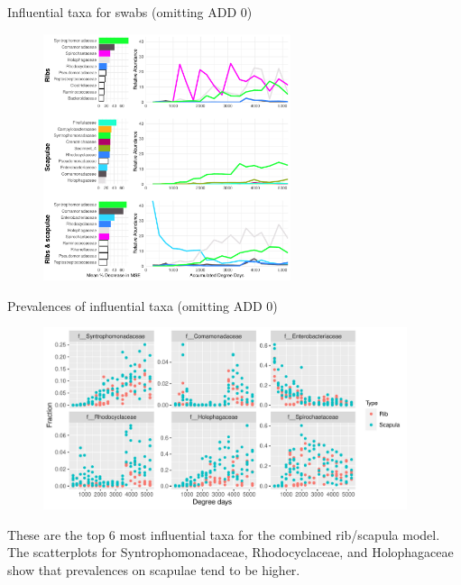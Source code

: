 \documentclass{beamer}
\begin{document}
\begin{frame}{Influential taxa for swabs (omitting ADD 0)}

  \begin{center}
    \begin{figure}
      \includegraphics[height=2.85in]
        {w_bones/bacteria/use_families/hl_combined_family_no_baseline_6panels}
    \end{figure}
  \end{center}

\end{frame}



\begin{frame}{Prevalences of influential taxa (omitting ADD 0)}

  \begin{center}
    \begin{figure}
      \includegraphics[height=2.1in]
        {w_bones/bacteria/use_families/both_ribs_scapulae/no_baseline/infl_combined_bone_no_baseline_family_scatter}
    \end{figure}
  \end{center}

  \vspace{0.1in}

  \footnotesize{ \noindent These are the top 6 most influential taxa for the
    combined rib/scapula model.  The scatterplots for Syntrophomonadaceae,
    Rhodocyclaceae, and Holophagaceae show that prevalences on scapulae tend to
    be higher.
    }

\end{frame}
\end{document}
